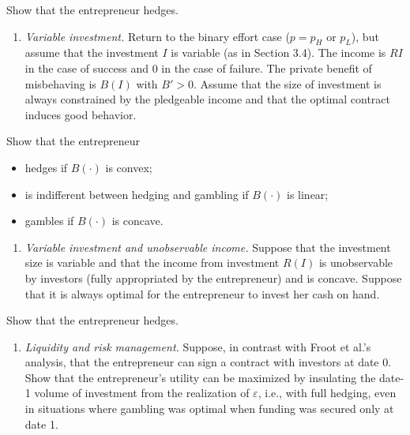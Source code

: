 \documentclass[11pt,a4paper]{article}
\providecommand{\tightlist}{\setlength{\itemsep}{0pt}\setlength{\parskip}{0pt}}
\begin{document}
Show that the entrepreneur hedges.

\begin{enumerate}
\def\labelenumi{(\roman{enumi})}
\setcounter{enumi}{2}
\tightlist
\item
  \emph{Variable investment.} Return to the binary effort case (\(p = p_H\) or \(p_L\)), but assume
  that the investment \(I\) is variable (as in Section 3.4). The income is \(RI\) in the case of
  success and 0 in the case of failure. The private benefit of misbehaving is \(B(I)\) with
  \(B' > 0\). Assume that the size of investment is always constrained by the pledgeable income and
  that the optimal contract induces good behavior.
\end{enumerate}

Show that the entrepreneur

\begin{itemize}
\tightlist
\item
  hedges if \(B(\cdot)\) is convex;
\item
  is indifferent between hedging and gambling if \(B(\cdot)\) is linear;
\item
  gambles if \(B(\cdot)\) is concave.
\end{itemize}

\begin{enumerate}
\def\labelenumi{(\roman{enumi})}
\setcounter{enumi}{3}
\tightlist
\item
  \emph{Variable investment and unobservable income.} Suppose that the investment size is variable
  and that the income from investment \(R(I)\) is unobservable by investors (fully appropriated by
  the entrepreneur) and is concave. Suppose that it is always optimal for the entrepreneur to invest
  her cash on hand.
\end{enumerate}

Show that the entrepreneur hedges.

\begin{enumerate}
\def\labelenumi{(\alph{enumi})}
\setcounter{enumi}{21}
\tightlist
\item
  \emph{Liquidity and risk management.} Suppose, in contrast with Froot et al.'s analysis, that the
  entrepreneur can sign a contract with investors at date 0. Show that the entrepreneur's utility
  can be maximized by insulating the date-1 volume of investment from the realization of
  \(\varepsilon\), i.e., with full hedging, even in situations where gambling was optimal when
  funding was secured only at date 1.
\end{enumerate}
\end{document}
